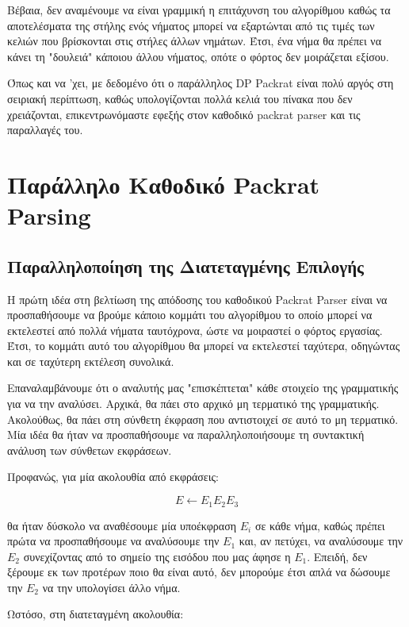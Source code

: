 Βέβαια, δεν αναμένουμε να είναι γραμμική η επιτάχυνση του αλγορίθμου καθώς τα αποτελέσματα της στήλης ενός νήματος μπορεί να εξαρτώνται από τις τιμές των κελιών που βρίσκονται στις στήλες άλλων νημάτων.
Έτσι, ένα νήμα θα πρέπει να κάνει τη "δουλειά" κάποιου άλλου νήματος, οπότε ο φόρτος δεν μοιράζεται εξίσου.

Όπως και να 'χει, με δεδομένο ότι ο παράλληλος DP Packrat είναι πολύ αργός στη σειριακή περίπτωση, καθώς υπολογίζονται πολλά κελιά του πίνακα που δεν χρειάζονται, επικεντρωνόμαστε εφεξής στον καθοδικό packrat parser και τις παραλλαγές του.

\section{Παράλληλο Καθοδικό Packrat Parsing}

\subsection{Παραλληλοποίηση της Διατεταγμένης Επιλογής}

Η πρώτη ιδέα στη βελτίωση της απόδοσης του καθοδικού Packrat Parser είναι να προσπαθήσουμε να βρούμε κάποιο κομμάτι του αλγορίθμου το οποίο μπορεί να εκτελεστεί από πολλά νήματα ταυτόχρονα, ώστε να μοιραστεί ο φόρτος εργασίας.
Έτσι, το κομμάτι αυτό του αλγορίθμου θα μπορεί να εκτελεστεί ταχύτερα, οδηγώντας και σε ταχύτερη εκτέλεση συνολικά.

Επαναλαμβάνουμε ότι ο αναλυτής μας "επισκέπτεται" κάθε στοιχείο της γραμματικής για να την αναλύσει.
Αρχικά, θα πάει στο αρχικό μη τερματικό της γραμματικής. 
Ακολούθως, θα πάει στη σύνθετη έκφραση που αντιστοιχεί σε αυτό το μη τερματικό.
Μία ιδέα θα ήταν να προσπαθήσουμε να παραλληλοποιήσουμε τη συντακτική ανάλυση των σύνθετων εκφράσεων.

Προφανώς, για μία ακολουθία από εκφράσεις:

\begin{equation}
	E \leftarrow E_1 E_2 E_3
\end{equation}

θα ήταν δύσκολο να αναθέσουμε μία υποέκφραση $E_i$ σε κάθε νήμα, καθώς πρέπει πρώτα να προσπαθήσουμε να αναλύσουμε την $E_1$ και, αν πετύχει, να αναλύσουμε την $E_2$ συνεχίζοντας από το σημείο της εισόδου που μας άφησε η $E_1$. 
Επειδή, δεν ξέρουμε εκ των προτέρων ποιο θα είναι αυτό, δεν μπορούμε έτσι απλά να δώσουμε την $E_2$ να την υπολογίσει άλλο νήμα.

Ωστόσο, στη διατεταγμένη ακολουθία:

